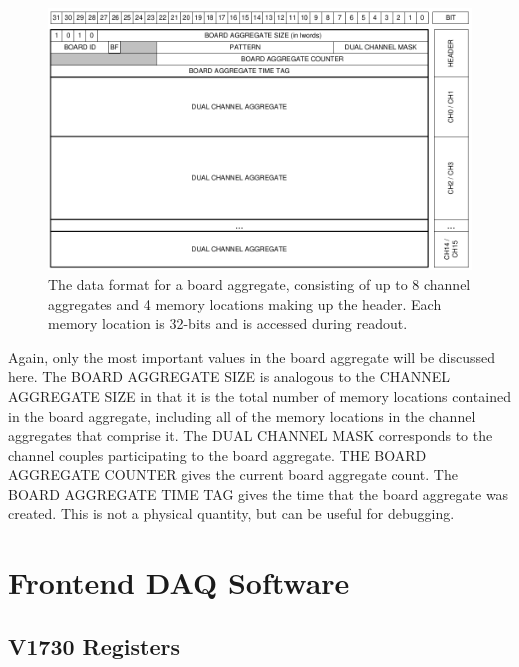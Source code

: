 \begin{figure}[b!]
\centering
\includegraphics[scale=0.33]{Chapter-5/figs/BoardAgg.png}
\caption{The data format for a board aggregate, consisting of up to 8 channel aggregates and 4 memory locations making up the header. Each memory location is 32-bits and is accessed during readout.}
\label{BoardAgg}
\end{figure}

Again, only the most important values in the board aggregate will be discussed here. The BOARD AGGREGATE SIZE is analogous to the CHANNEL AGGREGATE SIZE in that it is the total number of memory locations contained in the board aggregate, including all of the memory locations in the channel aggregates that comprise it. The DUAL CHANNEL MASK corresponds to the channel couples participating to the board aggregate. THE BOARD AGGREGATE COUNTER gives the current board aggregate count. The BOARD AGGREGATE TIME TAG gives the time that the board aggregate was created. This is not a physical quantity, but can be useful for debugging.



\pagebreak
\section{Frontend DAQ Software} \label{frontend}

\subsection{V1730 Registers} \label{registers}

